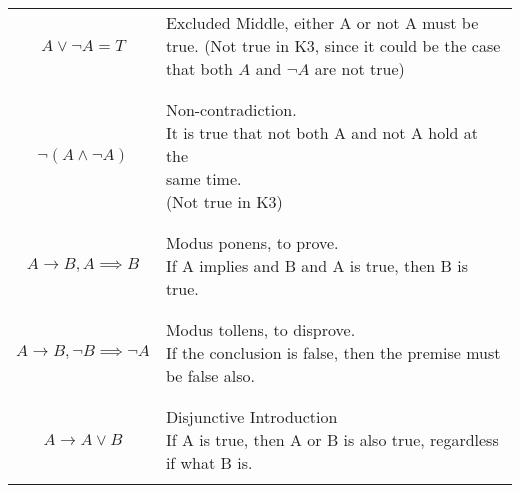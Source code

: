 \documentclass{article}
\begin{document}
\begin{table}[H]
    \centering
    \large
    \begin{tabular}{c l}
        $A \vee \lnot A = T$ & \makecell[l]{
            Excluded Middle, either A or not A must be true.\\
            (Not true in K3, since it could be the case that both \\ $A$ and $\lnot A$ are not true)
        }\\
        &\\
        \hline
        &\\
        $\lnot (A \wedge \lnot A)$ & \makecell[l]{
            Non-contradiction.\\ It is true that not both A and not A hold at the \\same time. 
            \\(Not true in K3)
        }\\
        &\\
        \hline
        &\\
        $A \rightarrow B, A \implies B$ & \makecell[l]{Modus ponens, to prove. \\
        If A implies and B and A is true, then B is true.}\\
        &\\
        \hline
        &\\
        $A \rightarrow B, \lnot B \implies \lnot A$ & \makecell[l]{Modus tollens, to disprove. \\
        If the conclusion is false, then the premise must be false also.}\\
        &\\
        \hline
        &\\
        $A \rightarrow A\vee B$ & \makecell[l]{Disjunctive Introduction\\
        If A is true, then A or B is also true, regardless if what B is.}\\
        &\\
        \hline


\end{tabular}
\end{table}
\end{document}
